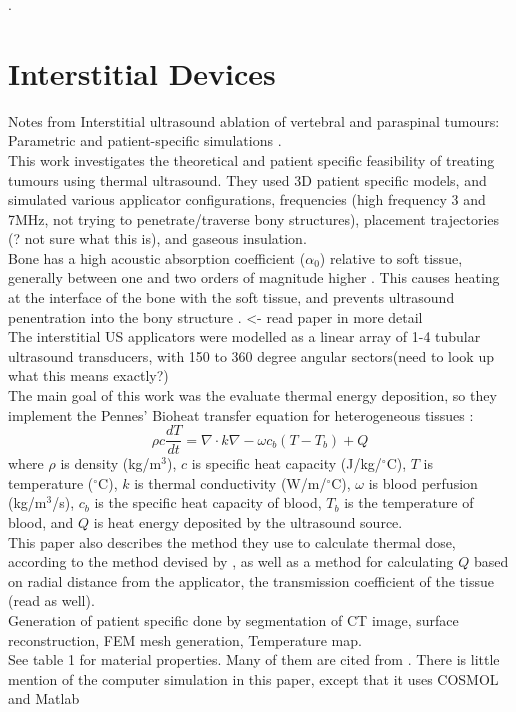 \documentclass[11pt,titlepage]{article} %
\begin{document}
. 


\section{Interstitial Devices}

Notes from Interstitial ultrasound ablation of vertebral and paraspinal tumours: Parametric and patient-specific simulations \cite{scott2014interstitial}.\\
This work investigates the theoretical and patient specific feasibility of treating tumours using thermal ultrasound.
They used 3D patient specific models, and simulated various applicator configurations, frequencies (high frequency 3 and 7MHz, not trying to penetrate/traverse bony structures), placement trajectories (? not sure what this is), and gaseous insulation.\\
Bone has a high acoustic absorption coefficient ($\alpha_0$) relative to soft tissue, generally between one and two orders of magnitude higher \cite{duck1990physical}. This causes heating at the interface of the bone with the soft tissue, and prevents ultrasound penentration into the bony structure \cite{fujii1999study}. <- read paper in more detail\\
The interstitial US applicators were modelled as a linear array of 1-4 tubular ultrasound transducers, with 150 to 360 degree angular sectors(need to look up what this means exactly?)\\
The main goal of this work was the evaluate thermal energy deposition, so they implement the Pennes' Bioheat transfer equation for heterogeneous tissues \cite{pennes1948analysis}:
\begin{equation}
\rho c \frac{dT}{dt} = \nabla \cdot k \nabla - \omega c_b(T-T_b)+Q
\end{equation}
where $\rho$ is density (kg/m$^3$), $c$ is specific heat capacity (J/kg/$^{\circ}$C), $T$ is temperature ($^{\circ}$C), $k$ is thermal conductivity (W/m/$^{\circ}$C), $\omega$ is blood perfusion (kg/m$^3$/s), $c_b$ is the specific heat capacity of blood, $T_b$ is the temperature of blood, and $Q$ is heat energy deposited by the ultrasound source. \\
This paper also describes the method they use to calculate thermal dose, according to the method devised by \cite{sapareto1984thermal}, as well as a method for calculating $Q$ based on radial distance from the applicator, the transmission coefficient of the tissue (read \cite{scott2013interstitial} as well).\\
Generation of patient specific done by segmentation of CT image, surface reconstruction, FEM mesh generation, Temperature map.\\
See table 1 for material properties. Many of them are cited from \cite{duck1990physical}.
There is little mention of the computer simulation in this paper, except that it uses COSMOL and Matlab\\
\end{document}
